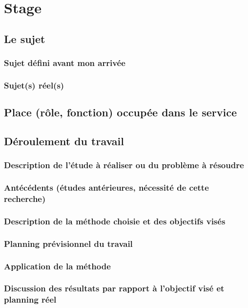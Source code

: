 \chapter{Stage}

\section{Le sujet}
	\subsection{Sujet défini avant mon arrivée}
		\lipsum[1-2]

	\subsection{Sujet(s) réel(s)}
		\lipsum[1-2]

\section{Place (rôle, fonction) occupée dans le service}
	\lipsum

\section{Déroulement du travail}
	\subsection{Description de l'étude à réaliser ou du problème à résoudre}
		\lipsum[1-2]

	\subsection{Antécédents (études antérieures, nécessité de cette recherche)}
		\lipsum[1-2]

	\subsection{Description de la méthode choisie et des objectifs visés}
		\lipsum[1-2]

	\subsection{Planning prévisionnel du travail}
		\lipsum[1-2]

	\subsection{Application de la méthode}
		\lipsum[1-2]

	\subsection{Discussion des résultats par rapport à l'objectif visé et planning réel}
		\lipsum[1-2]